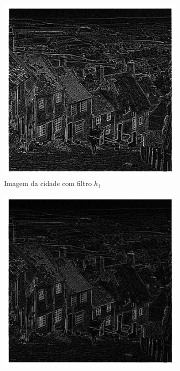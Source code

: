 \documentclass[12pt,a4paper]{report}
\begin{document}
\begin{enumerate}
    \begin{figure}[H]
      \centering
      \begin{subfigure}{0.6\textwidth}
        \includegraphics[width=\linewidth]{imagens/ex10-01.png}
      \caption{Imagem da cidade com filtro $h_1$}
      \end{subfigure}
      \begin{subfigure}{0.6\textwidth}
        \includegraphics[width=\linewidth]{imagens/ex10-05.png}

\end{subfigure}
\end{figure}
\end{enumerate}
\end{document}
